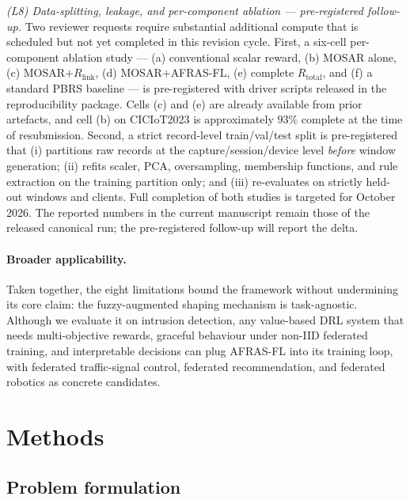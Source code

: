 \documentclass[ai,article,submit,moreauthors,pdftex]{Definitions/mdpi}
\newcommand{\rev}[1]{#1}
\begin{document}
\rev{\emph{(L8) Data-splitting, leakage, and per-component ablation --- pre-registered follow-up.} Two reviewer requests require substantial additional compute that is scheduled but not yet completed in this revision cycle. First, a six-cell per-component ablation study --- (a) conventional scalar reward, (b) MOSAR alone, (c) MOSAR$+R_{\text{link}}$, (d) MOSAR$+$AFRAS-FL, (e) complete $R_{\text{total}}$, and (f) a standard PBRS baseline --- is pre-registered with driver scripts released in the reproducibility package. Cells (c) and (e) are already available from prior artefacts, and cell (b) on CICIoT2023 is approximately $93\%$ complete at the time of resubmission. Second, a strict record-level train/val/test split is pre-registered that (i) partitions raw records at the capture/session/device level \emph{before} window generation; (ii) refits scaler, PCA, oversampling, membership functions, and rule extraction on the training partition only; and (iii) re-evaluates on strictly held-out windows and clients. Full completion of both studies is targeted for October 2026. The reported numbers in the current manuscript remain those of the released canonical run; the pre-registered follow-up will report the delta.}

\paragraph{Broader applicability.}
Taken together, the \rev{eight} limitations bound the framework without
undermining its core claim: the fuzzy-augmented shaping mechanism
is task-agnostic. Although we evaluate it on intrusion detection,
any value-based DRL system that needs multi-objective rewards,
graceful behaviour under non-IID federated training, and
interpretable decisions can plug AFRAS-FL into its training loop,
with federated traffic-signal control, federated recommendation,
and federated robotics as concrete candidates.


\section{Methods}\label{sec:methods}

\subsection{Problem formulation}\label{sec:methods_problem}
\end{document}

